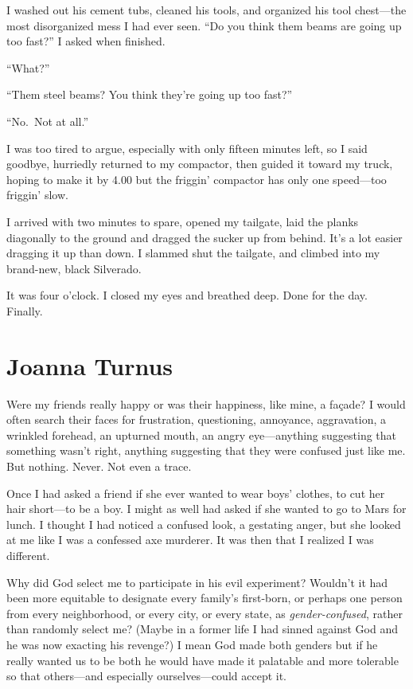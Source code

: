 I washed out his cement tubs, cleaned his tools, and organized his tool
chest---the most disorganized mess I had ever seen. ``Do you think them
beams are going up too fast?'' I asked when finished.

``What?''

``Them steel beams? You think they're going up too fast?''

``No.~Not at all.''

I was too tired to argue, especially with only fifteen minutes left, so
I said goodbye, hurriedly returned to my compactor, then guided it
toward my truck, hoping to make it by 4.00 but the friggin' compactor
has only one speed---too friggin' slow.

I arrived with two minutes to spare, opened my tailgate, laid the planks
diagonally to the ground and dragged the sucker up from behind. It's a
lot easier dragging it up than down. I slammed shut the tailgate, and
climbed into my brand-new, black Silverado.

It was four o'clock. I closed my eyes and breathed deep. Done for the
day. Finally.

\chapter{Joanna Turnus}

\titlemark

Were my friends really happy or was their happiness, like mine, a
façade? I would often search their faces for frustration, questioning,
annoyance, aggravation, a wrinkled forehead, an upturned mouth, an angry
eye---anything suggesting that something wasn't right, anything
suggesting that they were confused just like me. But nothing. Never. Not
even a trace.

Once I had asked a friend if she ever wanted to wear boys' clothes, to
cut her hair short---to be a boy. I might as well had asked if she
wanted to go to Mars for lunch. I thought I had noticed a confused look,
a gestating anger, but she looked at me like I was a confessed axe
murderer. It was then that I realized I was different.

Why did God select me to participate in his evil experiment? Wouldn't it
had been more equitable to designate every family's first-born, or
perhaps one person from every neighborhood, or every city, or every
state, as \emph{gender-confused}, rather than randomly select me? (Maybe
in a former life I had sinned against God and he was now exacting his
revenge?) I mean God made both genders but if he really wanted us to be
both he would have made it palatable and more tolerable so that
others---and especially ourselves---could accept it.

